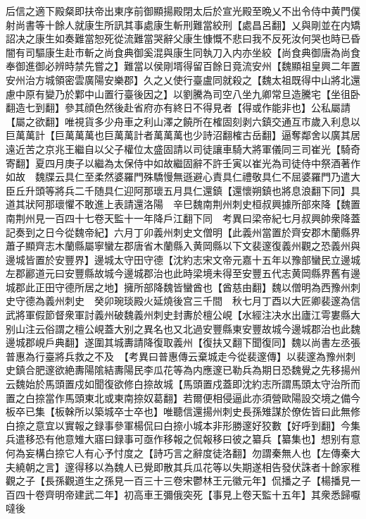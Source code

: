 后信之適下殿粲即扶帝出東序前御顯揚殿閉太后於宣光殿至晩乂不出令侍中黄門僕射尚書等十餘人就康生所訊其事處康生斬刑難當絞刑【處昌呂翻】乂與剛並在内矯詔决之康生如奏難當恕死從流難當哭辭父康生慷慨不悲曰我不反死汝何哭也時已昏闇有司驅康生赴市斬之尚食典御奚混與康生同執刀入内亦坐絞【尚食典御唐為尚食奉御進御必辨時禁先嘗之】難當以侯剛壻得留百餘日竟流安州【魏顯祖皇興二年置安州治方城領密雲廣陽安樂郡】久之乂使行臺盧同就殺之【魏太祖既得中山將北還慮中原有變乃於鄴中山置行臺後因之】以劉騰為司空八坐九卿常旦造騰宅【坐徂卧翻造七到翻】參其顔色然後赴省府亦有終日不得見者【得或作能非也】公私屬請【屬之欲翻】唯視貨多少舟車之利山澤之饒所在榷固刻剥六鎮交通互市歲入利息以巨萬萬計【巨萬萬萬也巨萬萬計者萬萬萬也少詩沼翻榷古岳翻】逼奪鄰舍以廣其居遠近苦之京兆王繼自以父子權位太盛固請以司徒讓車騎大將軍儀同三司崔光【騎奇寄翻】夏四月庚子以繼為太保侍中如故繼固辭不許壬寅以崔光為司徒侍中祭酒著作如故　魏牒云具仁至柔然婆羅門殊驕慢無遜避心責具仁禮敬具仁不屈婆羅門乃遣大臣丘升頭等將兵二千随具仁迎阿那瓌五月具仁還鎮【還懷朔鎮也將息浪翻下同】具道其狀阿那瓌懼不敢進上表請還洛陽　辛巳魏南荆州刺史桓叔興據所部來降【魏置南荆州見一百四十七卷天監十一年降戶江翻下同　考異曰梁帝紀七月叔興帥衆降蓋記奏到之日今從魏帝紀】六月丁卯義州刺史文僧明【此義州當置於齊安郡木蘭縣界蕭子顯齊志木蘭縣屬寧蠻左郡唐省木蘭縣入黄岡縣以下文裴邃復義州觀之恐義州與邊城皆置於安豐界】邊城太守田守德【沈約志宋文帝元嘉十五年以豫部蠻民立邊城左郡酈道元曰安豐縣故城今邊城郡治也此時梁境未得至安豐五代志黄岡縣界舊有邊城郡此正田守德所居之地】擁所部降魏皆蠻酋也【酋慈由翻】魏以僧明為西豫州刺史守德為義州刺史　癸卯琬琰殿火延燒後宫三千間　秋七月丁酉以大匠卿裴邃為信武將軍假節督衆軍討義州破魏義州刺史封夀於檀公峴【水經注决水出廬江雩婁縣大别山注云俗謂之檀公峴蓋大别之異名也又北過安豐縣東安豐故城今邊城郡治也此魏邊城郡峴戶典翻】遂圍其城夀請降復取義州【復扶又翻下聞復同】魏以尚書左丞張普惠為行臺將兵救之不及　【考異曰普惠傳云棄城走今從裴邃傳】以裴邃為豫州刺史鎮合肥邃欲絶夀陽隂結夀陽民李瓜花等為内應邃已勒兵為期日恐魏覺之先移揚州云魏始於馬頭置戍如聞復欲修白捺故城【馬頭置戍蓋即沈約志所謂馬頭太守治所而置之白捺當作馬頭東北或東南捺奴葛翻】若爾便相侵逼此亦須營歐陽設交境之備今板卒已集【板榦所以築城卒士卒也】唯聽信還揚州刺史長孫雉謀於僚佐皆曰此無修白捺之意宜以實報之録事參軍楊侃曰白捺小城本非形勝邃好狡數【好呼到翻】今集兵遣移恐有他意雉大寤曰録事可亟作移報之侃報移曰彼之纂兵【纂集也】想别有意何為妄構白捺它人有心予忖度之【詩巧言之辭度徒洛翻】勿謂秦無人也【左傳秦大夫繞朝之言】邃得移以為魏人已覺即散其兵瓜花等以失期遂相告發伏誅者十餘家稚觀之子【長孫觀道生之孫見一百三十三卷宋鬱林王元徽元年】侃播之子【楊播見一百四十卷齊明帝建武二年】初高車王彌俄突死【事見上卷天監十五年】其衆悉歸嚈噠後

